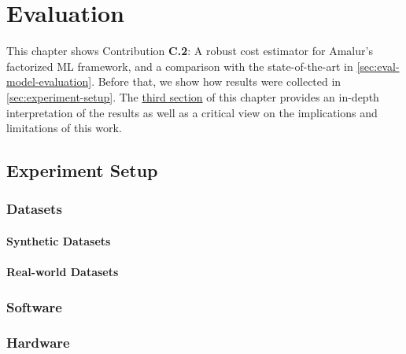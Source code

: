 
\chapter{Evaluation}
\label{chapter:evaluation-discussion}
This chapter shows Contribution \textbf{C.2}: A robust cost estimator for Amalur's factorized ML framework, and a comparison with the state-of-the-art in \autoref{sec:eval-model-evaluation}. Before that, we show how results were collected in \autoref{sec:experiment-setup}. The \hyperref[sec:eval-discussion]{third section} of this chapter provides an in-depth interpretation of the results as well as a critical view on the implications and limitations of this work.

\section{Experiment Setup}

\label{sec:experiment-setup}


\subsection{Datasets}

\subsubsection{Synthetic Datasets}

\subsubsection{Real-world Datasets}

\subsection{Software}



\subsection{Hardware}

